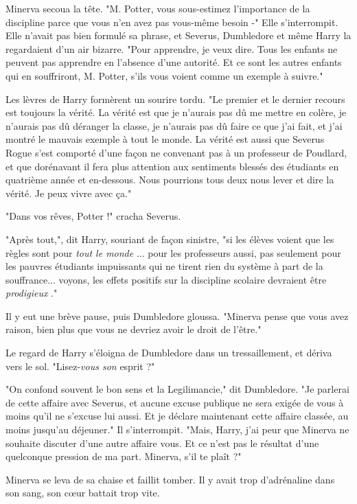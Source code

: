 Minerva secoua la tête. "M. Potter, vous sous-estimez l'importance de la discipline parce que vous n'en avez pas vous-même besoin -" Elle s'interrompit. Elle n'avait pas bien formulé sa phrase, et Severus, Dumbledore et même Harry la regardaient d'un air bizarre. "Pour apprendre, je veux dire. Tous les enfants ne peuvent pas apprendre en l'absence d'une autorité. Et ce sont les autres enfants qui en souffriront, M. Potter, s'ils vous voient comme un exemple à suivre."

Les lèvres de Harry formèrent un sourire tordu. "Le premier et le dernier recours est toujours la vérité. La vérité est que je n'aurais pas dû me mettre en colère, je n'aurais pas dû déranger la classe, je n'aurais pas dû faire ce que j'ai fait, et j'ai montré le mauvais exemple à tout le monde. La vérité est aussi que Severus Rogue s'est comporté d'une façon ne convenant pas à un professeur de Poudlard, et que dorénavant il fera plus attention aux sentiments blessés des étudiants en quatrième année et en-dessous. Nous pourrions tous deux nous lever et dire la vérité. Je peux vivre avec ça."

"Dans vos rêves, Potter !" cracha Severus.

"Après tout,", dit Harry, souriant de façon sinistre, "si les élèves voient que les règles sont pour \emph{tout le monde} ... pour les professeurs aussi, pas seulement pour les pauvres étudiants impuissants qui ne tirent rien du système à part de la souffrance... voyons, les effets positifs sur la discipline scolaire devraient être \emph{prodigieux} ."

Il y eut une brève pause, puis Dumbledore gloussa. "Minerva pense que vous avez raison, bien plus que vous ne devriez avoir le droit de l'être."

Le regard de Harry s'éloigna de Dumbledore dans un tressaillement, et dériva vers le sol. "Lisez-\emph{vous son}  esprit ?"

"On confond souvent le bon sens et la Legilimancie," dit Dumbledore. "Je parlerai de cette affaire avec Severus, et aucune excuse publique ne sera exigée de vous à moins qu'il ne s'excuse lui aussi. Et je déclare maintenant cette affaire classée, au moins jusqu'au déjeuner." Il s'interrompit. "Mais, Harry, j'ai peur que Minerva ne souhaite discuter d'une autre affaire vous. Et ce n'est pas le résultat d'une quelconque pression de ma part. Minerva, s'il te plaît ?"

Minerva se leva de sa chaise et faillit tomber. Il y avait trop d'adrénaline dans son sang, son cœur battait trop vite.

